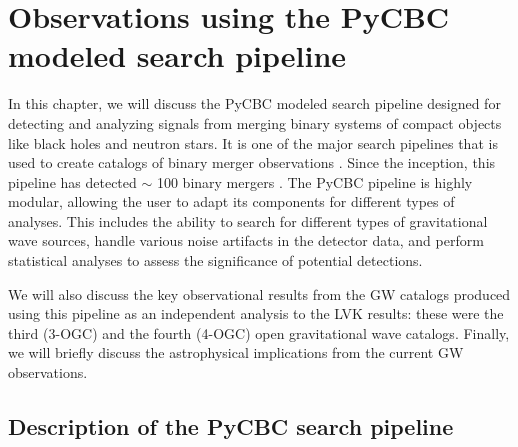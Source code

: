 \chapter{Observations using the PyCBC modeled search pipeline}


In this chapter, we will discuss the PyCBC modeled search pipeline designed for detecting and analyzing signals from merging binary systems of compact objects like black holes and neutron stars. It is one of the major search pipelines that is used to create catalogs of binary merger observations \cite{Usman_pycbc,Allen:2005fk}. Since the inception, this pipeline has detected $\sim$ 100 binary mergers \cite{Nitz:2021uxj,2ogc,1OGC}. The PyCBC pipeline is highly modular, allowing the user to adapt its components for different types of analyses. This includes the ability to search for different types of gravitational wave sources, handle various noise artifacts in the detector data, and perform statistical analyses to assess the significance of potential detections.

We will also discuss the key observational results from the GW catalogs produced using this pipeline as an independent analysis to the LVK results: these were the third (3-OGC) \cite{Nitz:2021uxj} and the fourth (4-OGC) \cite{Nitz:2021zwj} open gravitational wave catalogs. Finally, we will briefly discuss the astrophysical implications from the current GW observations. 


\section{Description of the PyCBC search pipeline}\label{sec:pycbc-pipeline}


